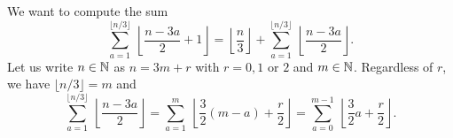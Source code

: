 \documentclass[a4paper,10pt]{article}
\begin{document}
        We want to compute the sum
        \begin{equation}
            \sum^{\lfloor n/3\rfloor}_{a=1}~\left\lfloor \frac{n-3a}{2}+1\right\rfloor = \left\lfloor \frac{n}{3}\right\rfloor + \sum^{\lfloor n/3\rfloor}_{a=1}~\left\lfloor \frac{n-3a}{2}\right\rfloor.
        \end{equation}
        Let us write $n\in\mathbb{N}$ as $n=3m+r$ with $r=0,1$ or $2$ and $m\in\mathbb{N}$. Regardless of $r$, we have $\lfloor n/3\rfloor=m$ and
        \begin{equation}
            \sum^{\lfloor n/3\rfloor}_{a=1}~\left\lfloor \frac{n-3a}{2}\right\rfloor = \sum^{m}_{a=1}~\left\lfloor \frac{3}{2}(m-a)+\frac{r}{2}\right\rfloor = \sum^{m-1}_{a=0}~\left\lfloor \frac{3}{2}a+\frac{r}{2}\right\rfloor.\label{eq:sumfloor}
        \end{equation}
\end{document}
